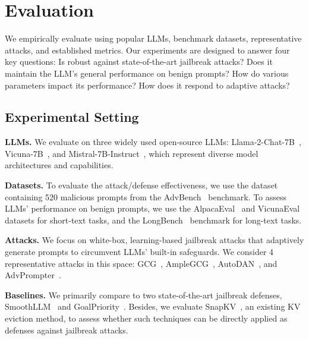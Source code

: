 
\section{Evaluation}
\label{sec:eval}
We empirically evaluate \rkv using popular LLMs, benchmark datasets, representative attacks, and established metrics. Our experiments are designed to answer four key questions:  Is \rkv robust against state-of-the-art jailbreak attacks?  Does it maintain the LLM's general performance on benign prompts?  How do various parameters impact its performance?  How does it respond to adaptive attacks?



\subsection{Experimental Setting}

{\bf LLMs.} We evaluate \rkv on three widely used open-source LLMs: Llama-2-Chat-7B~\citep{llama2}, Vicuna-7B~\citep{vicuna}, and Mistral-7B-Instruct~\citep{mistral7b}, which represent diverse model architectures and capabilities. %


{\bf Datasets.} To evaluate the attack/defense effectiveness, we use the dataset containing 520 malicious prompts from the AdvBench~\citep{gcg} benchmark. To  assess LLMs' performance on benign prompts, we use the AlpacaEval~\citep{alpacafarm} and VicunaEval~\citep{vicuna} datasets for short-text tasks, and the LongBench~\citep{longbench} benchmark for long-text tasks. 


{\bf Attacks.} We focus on white-box, learning-based jailbreak attacks that adaptively generate prompts to circumvent LLMs' built-in safeguards. We consider 4 representative attacks in this space:  GCG~\citep{gcg}, AmpleGCG~\citep{amplegcg}, AutoDAN~\citep{autodan}, and AdvPrompter~\citep{advprompter}. 

{\bf Baselines.} We primarily compare \rkv to two state-of-the-art jailbreak defenses, SmoothLLM~\citep{smoothllm}  and GoalPriority~\citep{goal-priority}. Besides, we evaluate SnapKV~\citep{snapkv}, an existing KV eviction method, to assess whether such techniques can be directly applied as defenses against jailbreak attacks.

